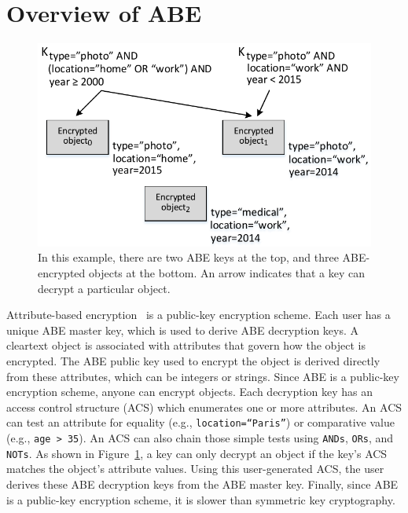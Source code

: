 \section{Overview of ABE}
\label{sec:abeOverview}

\begin{figure}
  \centering
     \includegraphics{figs/abeExample.pdf}
     \caption[ABE Example]{In this example, there are two ABE keys at the
              top, and three ABE-encrypted objects at the bottom.
              An arrow indicates that a key can decrypt a particular
              object.}
  \label{fig:abeExample}
\end{figure}

Attribute-based encryption~\cite{kpabe} is a 
public-key encryption scheme. Each
user has a unique ABE master key, which is used to derive
ABE decryption keys. 
A cleartext object is associated with attributes
that govern how the object is encrypted. 
The ABE public key used to encrypt the object is derived directly 
from these attributes, which can be integers or strings. 
Since ABE is a public-key
encryption scheme, anyone can encrypt objects. Each
decryption key has an access control structure
(ACS) which enumerates one or more attributes.
An ACS can test an attribute for equality (e.g.,
\texttt{location=``Paris''}) or comparative
value (e.g., \texttt{age > 35}). An ACS can
also chain those simple tests using \texttt{ANDs},
\texttt{ORs}, and \texttt{NOTs}. As shown in
Figure~\ref{fig:abeExample}, a key can only decrypt
an object if the key's ACS matches the object's
attribute values. Using this user-generated ACS, 
the user derives these ABE decryption
keys from the ABE master key. Finally,
since ABE is a public-key encryption scheme,
it is slower than symmetric key cryptography.

